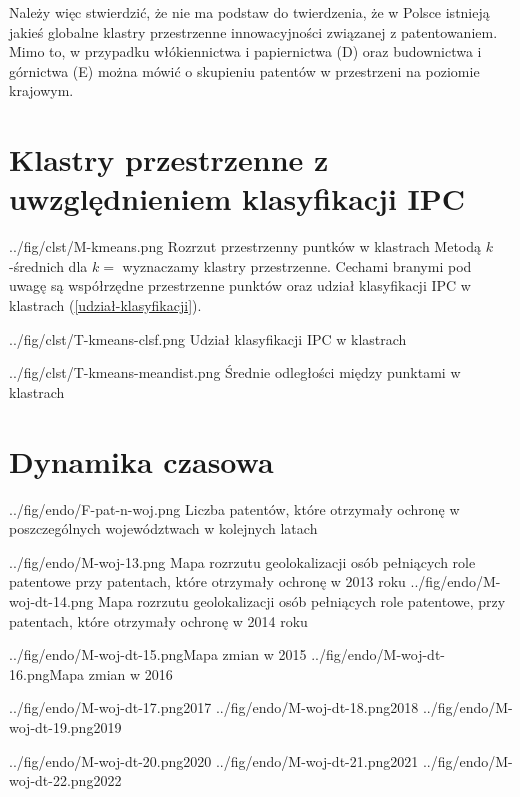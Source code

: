 Należy więc stwierdzić, że nie ma podstaw do twierdzenia, że w Polsce istnieją
jakieś globalne klastry przestrzenne innowacyjności związanej z patentowaniem.
Mimo to, w przypadku włókiennictwa i papiernictwa (D) oraz 
budownictwa i górnictwa (E) można mówić o skupieniu patentów w przestrzeni
na poziomie krajowym.




    \newpage\section
  {Klastry przestrzenne z uwzględnieniem klasyfikacji \ac{IPC}}

  \figside
{../fig/clst/M-kmeans.png}
{Rozrzut przestrzenny puntków w klastrach}
{
Metodą $k$-średnich dla $k=$ wyznaczamy klastry przestrzenne. 
Cechami branymi pod uwagę są współrzędne przestrzenne punktów oraz
udział klasyfikacji \ac{IPC} w klastrach (\cref{udział-klasyfikacji}).
}

\tblside
{../fig/clst/T-kmeans-clsf.png}
{Udział klasyfikacji \ac{IPC} w klastrach}

\tblside
{../fig/clst/T-kmeans-meandist.png}
{Średnie odległości między punktami w klastrach}




    \newpage\section{Dynamika czasowa}

  \figside
{../fig/endo/F-pat-n-woj.png}
{ Liczba patentów, które otrzymały ochronę w poszczególnych województwach 
  w kolejnych latach }

  \figsides
{../fig/endo/M-woj-13.png}
{ Mapa rozrzutu geolokalizacji osób pełniących role patentowe 
  przy patentach, które otrzymały ochronę w 2013 roku}
{../fig/endo/M-woj-dt-14.png}
{ Mapa rozrzutu geolokalizacji osób pełniących role patentowe, 
  przy patentach, które otrzymały ochronę w 2014 roku}

  \newpage\figsides
{../fig/endo/M-woj-dt-15.png}{Mapa zmian w 2015}
{../fig/endo/M-woj-dt-16.png}{Mapa zmian w 2016}

  \figsidesTri
{../fig/endo/M-woj-dt-17.png}{2017}
{../fig/endo/M-woj-dt-18.png}{2018}
{../fig/endo/M-woj-dt-19.png}{2019}

  \figsidesTri
{../fig/endo/M-woj-dt-20.png}{2020}
{../fig/endo/M-woj-dt-21.png}{2021}
{../fig/endo/M-woj-dt-22.png}{2022}



